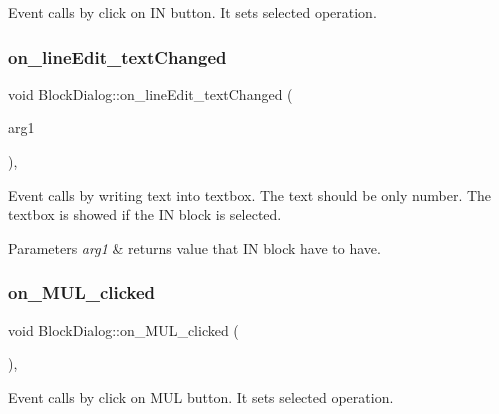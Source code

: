 Event calls by click on IN button. It sets selected operation. \mbox{\label{classBlockDialog_aadce9fabc644d0d73f36ddc3749c9975}} 
\subsubsection{\texorpdfstring{on\+\_\+line\+Edit\+\_\+text\+Changed}{on\_lineEdit\_textChanged}}
{\footnotesize\ttfamily void Block\+Dialog\+::on\+\_\+line\+Edit\+\_\+text\+Changed (\begin{DoxyParamCaption}\item[{const Q\+String \&}]{arg1 }\end{DoxyParamCaption})\hspace{0.3cm}{\ttfamily [private]}, {\ttfamily [slot]}}

Event calls by writing text into textbox. The text should be only number. The textbox is showed if the IN block is selected.


\begin{DoxyParams}{Parameters}
{\em arg1} & returns value that IN block have to have. \\
\hline
\end{DoxyParams}
\mbox{\label{classBlockDialog_a8d9ff3eb620ffcf02a184b7a5ca535ce}} 
\subsubsection{\texorpdfstring{on\+\_\+\+M\+U\+L\+\_\+clicked}{on\_MUL\_clicked}}
{\footnotesize\ttfamily void Block\+Dialog\+::on\+\_\+\+M\+U\+L\+\_\+clicked (\begin{DoxyParamCaption}{ }\end{DoxyParamCaption})\hspace{0.3cm}{\ttfamily [private]}, {\ttfamily [slot]}}

Event calls by click on M\+UL button. It sets selected operation. \mbox{\label{classBlockDialog_ab5afbbd67eb4c1ee11191cad1da29630}} 
